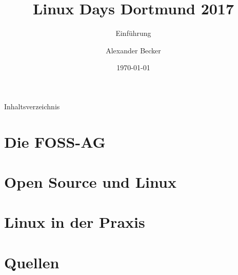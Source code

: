 \documentclass[12pt,utf8]{beamer}
\title{Linux Days Dortmund 2017}
\subtitle{Einführung}
\author{Alexander Becker}
\institute[FOSS AG]{Free and Open Source Software AG\\ Fakultät für Informatik}
\date{\today}
\begin{document}
	\begin{frame}
		\titlepage
	\end{frame}

\begin{frame}{Inhaltsverzeichnis}
\tableofcontents[hideallsubsections]
\end{frame}

\section{Die FOSS-AG}



\section{Open Source und Linux}



\section{Linux in der Praxis}



\section{Quellen}


\end{document}
